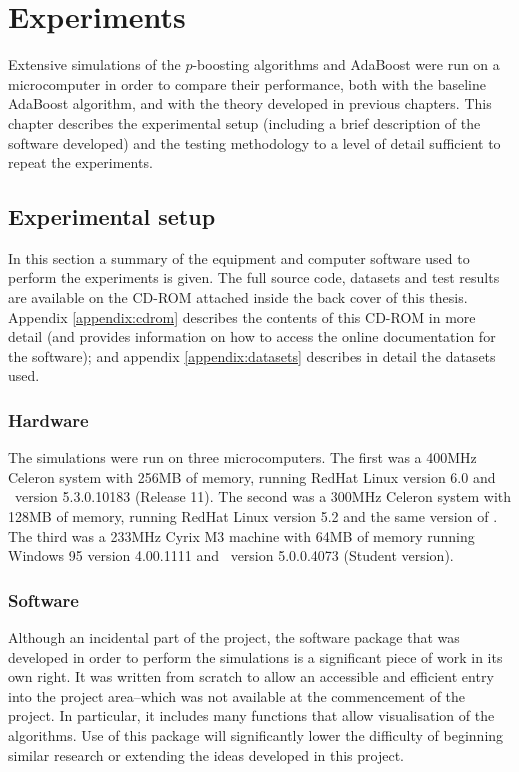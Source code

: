 

\chapter{Experiments}
\label{chapter:method}

Extensive simulations of the $p$-boosting algorithms and AdaBoost were
run on a microcomputer in order to compare their performance, both
with the baseline AdaBoost algorithm, and with the theory developed in
previous chapters.  This chapter describes the experimental setup
(including a brief description of the software developed) and the
testing methodology to a level of detail sufficient to repeat the
experiments.

\section{Experimental setup}

In this section a summary of the equipment and computer software used
to perform the experiments is given.  The full source code, datasets
and test results are available on the CD-ROM attached inside the back
cover of this thesis.  Appendix \ref{appendix:cdrom} describes the
contents of this CD-ROM in more detail (and provides information on
how to access the online documentation for the software); and appendix
\ref{appendix:datasets} describes in detail the datasets used.

\subsection{Hardware}

The simulations were run on three microcomputers.  The first was a
400MHz Celeron system with 256MB of memory, running RedHat Linux
version 6.0 and \MATLAB\ version 5.3.0.10183 (Release 11).  The second
was a 300MHz Celeron system with 128MB of memory, running RedHat Linux
version 5.2 and the same version of \MATLAB.  The third was a 233MHz
Cyrix M3 machine with 64MB of memory running Windows 95 version
4.00.1111 and \MATLAB\ version 5.0.0.4073 (Student version).

\subsection{Software}

Although an incidental part of the project, the software package that
was developed in order to perform the simulations is a significant
piece of work in its own right.  It was written from scratch to
allow an accessible and efficient entry into the project area--which
was not available at the commencement of the project.  In particular,
it includes many functions that allow visualisation of the algorithms.
Use of this package will significantly lower the difficulty of
beginning similar research or extending the ideas developed in this
project.

